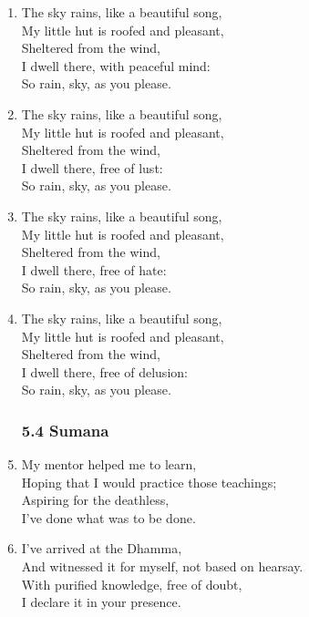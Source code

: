 \documentclass[10pt, openany]{book}
\begin{document}
\begin{enumerate}
\item The sky rains, like a beautiful song,\\
My little hut is roofed and pleasant, \\
Sheltered from the wind,\\
I dwell there, with peaceful mind:\\
So rain, sky, as you please.

\item The sky rains, like a beautiful song,\\
My little hut is roofed and pleasant, \\
Sheltered from the wind,\\
I dwell there, free of lust:\\
So rain, sky, as you please.

\item The sky rains, like a beautiful song,\\
My little hut is roofed and pleasant, \\
Sheltered from the wind,\\
I dwell there, free of hate:\\
So rain, sky, as you please.

\item The sky rains, like a beautiful song,\\
My little hut is roofed and pleasant, \\
Sheltered from the wind,\\
I dwell there, free of delusion:\\
So rain, sky, as you please.

\subsubsection*{5.4 Sumana}

\item My mentor helped me to learn,\\
Hoping that I would practice those teachings;\\
Aspiring for the deathless,\\
I’ve done what was to be done.

\item I’ve arrived at the Dhamma,\\
And witnessed it for myself, not based on hearsay.\\
With purified knowledge, free of doubt,\\
I declare it in your presence.


\end{enumerate}
\end{document}
